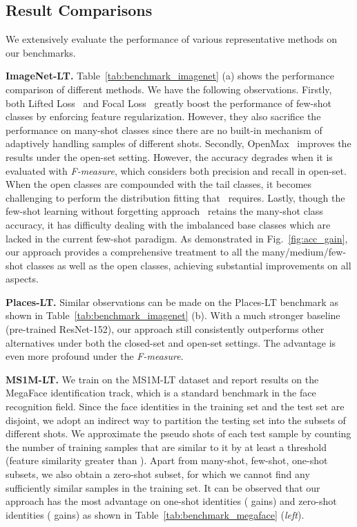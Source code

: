 \documentclass[10pt,twocolumn,letterpaper]{article}
\begin{document}
\subsection{Result Comparisons}

We extensively evaluate the performance of various representative methods on our benchmarks.

\vspace{2pt}
\noindent
\textbf{ImageNet-LT.}
Table~\ref{tab:benchmark_imagenet} (a) shows the performance comparison of different methods.
We have the following observations.
Firstly, both Lifted Loss~\cite{oh2016deep} and Focal Loss~\cite{lin2017focal} greatly boost the performance of few-shot classes by enforcing feature regularization.
However, they also sacrifice the performance on many-shot classes  since there are no built-in mechanism of adaptively handling  samples of different shots. 
Secondly, OpenMax~\cite{bendale2016towards} improves the results under the open-set setting.
However, the accuracy degrades when it is evaluated with \emph{F-measure}, which considers both precision and recall in open-set.
When the open classes are compounded with the tail classes, it becomes challenging to perform the distribution fitting that~\cite{bendale2016towards} requires.
Lastly, though the few-shot learning without forgetting approach~\cite{gidaris2018dynamic} retains the many-shot class accuracy, it has difficulty dealing with the imbalanced base classes which are lacked in the current few-shot paradigm.
As demonstrated in Fig.~\ref{fig:acc_gain}, our approach provides a comprehensive treatment to all the many/medium/few-shot classes as well as the open classes,  achieving substantial improvements on all aspects.

\vspace{2pt}
\noindent
\textbf{Places-LT.}
Similar observations can be made on the Places-LT benchmark as shown in Table~\ref{tab:benchmark_imagenet} (b).
With a much stronger baseline (\ie pre-trained ResNet-152), our approach still consistently outperforms other alternatives under both the closed-set and open-set settings.
The advantage is even more profound under the \emph{F-measure}.

\vspace{2pt}
\noindent
\textbf{MS1M-LT.}
We train on the MS1M-LT dataset and report results on the MegaFace identification track, which is a standard benchmark in the face recognition field.
Since the face identities in the training set and the test set are disjoint, we adopt an indirect way to partition the testing set into the subsets of different shots. We approximate the pseudo shots of each test sample by counting the number of training samples that are similar to it by at least a threshold (feature similarity greater than ). Apart from many-shot, few-shot, one-shot subsets, we also obtain a zero-shot subset, for which we cannot find any sufficiently similar samples in the training set.
It can be observed that our approach has the most advantage on one-shot identities ( gains) and zero-shot identities ( gains) as shown in Table~\ref{tab:benchmark_megaface} (\emph{left}).
\end{document}
